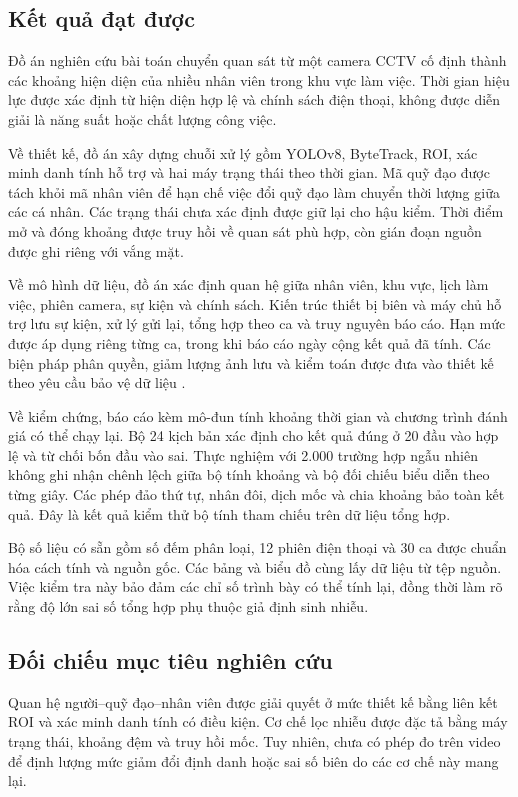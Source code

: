 \setcounter{section}{7}
\setcounter{subsection}{0}
\setcounter{subsubsection}{0}

\subsection{Kết quả đạt được}
Đồ án nghiên cứu bài toán chuyển quan sát từ một camera CCTV cố định thành các khoảng hiện diện của nhiều nhân viên trong khu vực làm việc. Thời gian hiệu lực được xác định từ hiện diện hợp lệ và chính sách điện thoại, không được diễn giải là năng suất hoặc chất lượng công việc.

Về thiết kế, đồ án xây dựng chuỗi xử lý gồm YOLOv8, ByteTrack, ROI, xác minh danh tính hỗ trợ và hai máy trạng thái theo thời gian. Mã quỹ đạo được tách khỏi mã nhân viên để hạn chế việc đổi quỹ đạo làm chuyển thời lượng giữa các cá nhân. Các trạng thái chưa xác định được giữ lại cho hậu kiểm. Thời điểm mở và đóng khoảng được truy hồi về quan sát phù hợp, còn gián đoạn nguồn được ghi riêng với vắng mặt.

Về mô hình dữ liệu, đồ án xác định quan hệ giữa nhân viên, khu vực, lịch làm việc, phiên camera, sự kiện và chính sách. Kiến trúc thiết bị biên và máy chủ hỗ trợ lưu sự kiện, xử lý gửi lại, tổng hợp theo ca và truy nguyên báo cáo. Hạn mức được áp dụng riêng từng ca, trong khi báo cáo ngày cộng kết quả đã tính. Các biện pháp phân quyền, giảm lượng ảnh lưu và kiểm toán được đưa vào thiết kế theo yêu cầu bảo vệ dữ liệu \cite{vnprivacy}.

Về kiểm chứng, báo cáo kèm mô-đun tính khoảng thời gian và chương trình đánh giá có thể chạy lại. Bộ 24 kịch bản xác định cho kết quả đúng ở 20 đầu vào hợp lệ và từ chối bốn đầu vào sai. Thực nghiệm với 2.000 trường hợp ngẫu nhiên không ghi nhận chênh lệch giữa bộ tính khoảng và bộ đối chiếu biểu diễn theo từng giây. Các phép đảo thứ tự, nhân đôi, dịch mốc và chia khoảng bảo toàn kết quả. Đây là kết quả kiểm thử bộ tính tham chiếu trên dữ liệu tổng hợp.

Bộ số liệu có sẵn gồm số đếm phân loại, 12 phiên điện thoại và 30 ca được chuẩn hóa cách tính và nguồn gốc. Các bảng và biểu đồ cùng lấy dữ liệu từ tệp nguồn. Việc kiểm tra này bảo đảm các chỉ số trình bày có thể tính lại, đồng thời làm rõ rằng độ lớn sai số tổng hợp phụ thuộc giả định sinh nhiễu.

\subsection{Đối chiếu mục tiêu nghiên cứu}
Quan hệ người--quỹ đạo--nhân viên được giải quyết ở mức thiết kế bằng liên kết ROI và xác minh danh tính có điều kiện. Cơ chế lọc nhiễu được đặc tả bằng máy trạng thái, khoảng đệm và truy hồi mốc. Tuy nhiên, chưa có phép đo trên video để định lượng mức giảm đổi định danh hoặc sai số biên do các cơ chế này mang lại.

